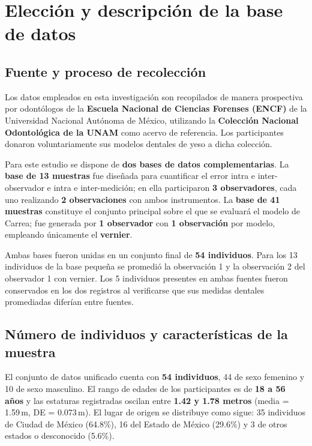 \documentclass[11pt,letterpaper]{article}
\begin{document}

\section*{Elección y descripción de la base de datos}

\subsection*{Fuente y proceso de recolección}

Los datos empleados en esta investigación son recopilados de manera prospectiva por odontólogos de la \textbf{Escuela Nacional de Ciencias Forenses (ENCF)} de la Universidad Nacional Autónoma de México, utilizando la \textbf{Colección Nacional Odontológica de la UNAM} como acervo de referencia. Los participantes donaron voluntariamente sus modelos dentales de yeso a dicha colección.

Para este estudio se dispone de \textbf{dos bases de datos complementarias}. La \textbf{base de 13 muestras} fue diseñada para cuantificar el error intra e inter-observador e intra e inter-medición; en ella participaron \textbf{3 observadores}, cada uno realizando \textbf{2 observaciones} con ambos instrumentos. La \textbf{base de 41 muestras} constituye el conjunto principal sobre el que se evaluará el modelo de Carrea; fue generada por \textbf{1 observador} con \textbf{1 observación} por modelo, empleando únicamente el \textbf{vernier}.

Ambas bases fueron unidas en un conjunto final de \textbf{54 individuos}. Para los 13 individuos de la base pequeña se promedió la observación 1 y la observación 2 del observador 1 con vernier. Los 5 individuos presentes en ambas fuentes fueron conservados en los dos registros al verificarse que sus medidas dentales promediadas diferían entre fuentes.

\subsection*{Número de individuos y características de la muestra}

El conjunto de datos unificado cuenta con \textbf{54 individuos}, 44 de sexo femenino y 10 de sexo masculino. El rango de edades de los participantes es de \textbf{18 a 56 años} y las estaturas registradas oscilan entre \textbf{1.42 y 1.78 metros} (media = 1.59\,m, DE = 0.073\,m). El lugar de origen se distribuye como sigue: 35 individuos de Ciudad de México (64.8\%), 16 del Estado de México (29.6\%) y 3 de otros estados o desconocido (5.6\%).
\end{document}
